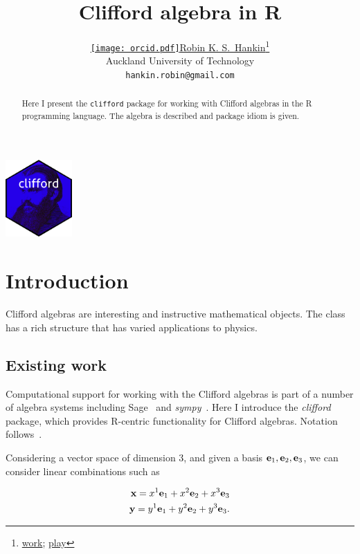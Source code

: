 \documentclass{article}
\title{Clifford algebra in R}
\author{ \href{https://orcid.org/0000-0001-5982-0415}{\texttt{[image: orcid.pdf]}\hspace{1mm}Robin K. S.~Hankin}\thanks{\href{https://academics.aut.ac.nz/robin.hankin}{work};  
\href{https://www.youtube.com/watch?v=JzCX3FqDIOc&list=PL9_n3Tqzq9iWtgD8POJFdnVUCZ_zw6OiB&ab_channel=TrinTragulaGeneralRelativity}{play}} \\
 Auckland University of Technology\\
	\texttt{hankin.robin@gmail.com} \\
}
\begin{document}
\maketitle

\begin{abstract}
Here I present the {\tt clifford} package for working with Clifford
algebras in the R programming language.  The algebra is described and
package idiom is given.
\end{abstract}





\hfill\includegraphics[width=1in]{clifford.png}

\section{Introduction}

Clifford algebras are interesting and instructive mathematical
objects.  The class has a rich structure that has varied applications
to physics.

\subsection{Existing work}

Computational support for working with the Clifford algebras is part
of a number of algebra systems including Sage~\citep{sagemath2019} and
\textit{sympy}~\citep{sympy2017}.  Here I introduce the
\textit{clifford} package, which provides R-centric functionality for
Clifford algebras.  Notation follows~\cite{snygg2010}.


\newcommand{\ei}[1]{\ensuremath{{\bf e}_{#1}}}
\newcommand{\bx}{\ensuremath{{\bf x}}}
\newcommand{\by}{\ensuremath{{\bf y}}}

Considering a vector space of dimension 3, and given a basis
$\ei{1},\ei{2},\ei{3}$, we can consider linear combinations such as

\begin{eqnarray}
\bx = x^1\ei{1} + x^2\ei{2} + x^3\ei{3}\nonumber\\
\by = y^1\ei{1} + y^2\ei{2} + y^3\ei{3}.
\end{eqnarray} 
\end{document}
